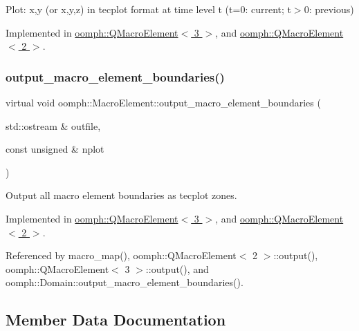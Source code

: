 Plot\+: x,y (or x,y,z) in tecplot format at time level t (t=0\+: current; t$>$0\+: previous) 



Implemented in \hyperlink{classoomph_1_1QMacroElement_3_013_01_4_a5c1916d58b2d3142b5fa85f209e16b4c}{oomph\+::\+Q\+Macro\+Element$<$ 3 $>$}, and \hyperlink{classoomph_1_1QMacroElement_3_012_01_4_a1fe56200453a2200e5103d3fb4793e38}{oomph\+::\+Q\+Macro\+Element$<$ 2 $>$}.

\mbox{\label{classoomph_1_1MacroElement_a748b561313e952c9767d278d0e99be4e}} 
\subsubsection{\texorpdfstring{output\+\_\+macro\+\_\+element\+\_\+boundaries()}{output\_macro\_element\_boundaries()}}
{\footnotesize\ttfamily virtual void oomph\+::\+Macro\+Element\+::output\+\_\+macro\+\_\+element\+\_\+boundaries (\begin{DoxyParamCaption}\item[{std\+::ostream \&}]{outfile,  }\item[{const unsigned \&}]{nplot }\end{DoxyParamCaption})\hspace{0.3cm}{\ttfamily [pure virtual]}}



Output all macro element boundaries as tecplot zones. 



Implemented in \hyperlink{classoomph_1_1QMacroElement_3_013_01_4_aeb5d117bf346d710bd4f8fc4f04dbfd5}{oomph\+::\+Q\+Macro\+Element$<$ 3 $>$}, and \hyperlink{classoomph_1_1QMacroElement_3_012_01_4_ae717a0b0098f830a1b1a5019ce5431a8}{oomph\+::\+Q\+Macro\+Element$<$ 2 $>$}.



Referenced by macro\+\_\+map(), oomph\+::\+Q\+Macro\+Element$<$ 2 $>$\+::output(), oomph\+::\+Q\+Macro\+Element$<$ 3 $>$\+::output(), and oomph\+::\+Domain\+::output\+\_\+macro\+\_\+element\+\_\+boundaries().



\subsection{Member Data Documentation}
\mbox{\label{classoomph_1_1MacroElement_a0eba5a165f20079899fb935508ab77e2}} 
